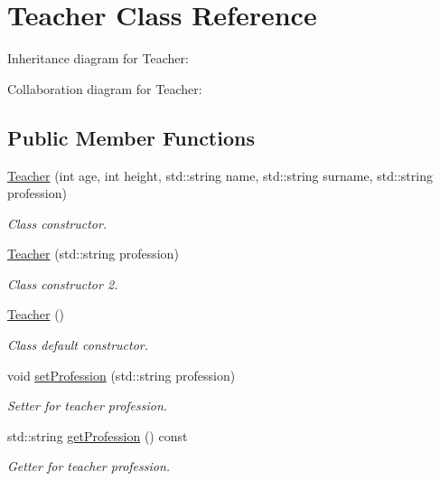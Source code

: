 \hypertarget{classTeacher}{}\section{Teacher Class Reference}
\label{classTeacher}


Inheritance diagram for Teacher\+:


Collaboration diagram for Teacher\+:
\subsection*{Public Member Functions}
\begin{DoxyCompactItemize}
\item 
\hyperlink{classTeacher_aa5505a3ae1de4412c44498498f3a3da3}{Teacher} (int age, int height, std\+::string name, std\+::string surname, std\+::string profession)
\begin{DoxyCompactList}\small\item\em Class constructor. \end{DoxyCompactList}\item 
\hyperlink{classTeacher_a04b863c162a0a99c59e4062656ec4d83}{Teacher} (std\+::string profession)
\begin{DoxyCompactList}\small\item\em Class constructor 2. \end{DoxyCompactList}\item 
\mbox{\label{classTeacher_a0d09b151c46e2abb647a2ae40cc5510c}} 
\hyperlink{classTeacher_a0d09b151c46e2abb647a2ae40cc5510c}{Teacher} ()
\begin{DoxyCompactList}\small\item\em Class default constructor. \end{DoxyCompactList}\item 
void \hyperlink{classTeacher_ae3ef60f3b04f282fac801942debfd3b3}{set\+Profession} (std\+::string profession)
\begin{DoxyCompactList}\small\item\em Setter for teacher profession. \end{DoxyCompactList}\item 
\mbox{\label{classTeacher_a980e640fad9bd54894326ffb2a5779ca}} 
std\+::string \hyperlink{classTeacher_a980e640fad9bd54894326ffb2a5779ca}{get\+Profession} () const
\begin{DoxyCompactList}\small\item\em Getter for teacher profession. \end{DoxyCompactList}\item 

\end{DoxyCompactItemize}
